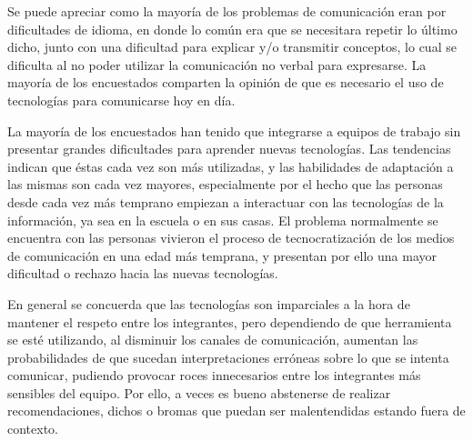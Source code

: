 Se puede apreciar como la mayoría de los problemas de comunicación eran por
dificultades de idioma, en donde lo común era que se necesitara repetir lo
último dicho, junto con una dificultad para explicar y/o transmitir conceptos,
lo cual se dificulta al no poder utilizar la comunicación no verbal para
expresarse. La mayoría de los encuestados comparten la opinión de que es
necesario el uso de tecnologías para comunicarse hoy en día. 

La mayoría de los encuestados han tenido que integrarse a equipos de trabajo
sin presentar grandes dificultades para aprender nuevas tecnologías. Las
tendencias indican que éstas cada vez son más utilizadas, y las habilidades de
adaptación a las mismas son cada vez mayores, especialmente por el hecho que
las personas desde cada vez más temprano empiezan a interactuar con las
tecnologías de la información, ya sea en la escuela o en sus casas. El
problema normalmente se encuentra con las personas vivieron el proceso de
tecnocratización de los medios de comunicación en una edad más temprana, y
presentan por ello una mayor dificultad o rechazo hacia las nuevas
tecnologías.

En general se concuerda que las tecnologías son imparciales a la hora de
mantener el respeto entre los integrantes, pero dependiendo de que herramienta
se esté utilizando, al disminuir los canales de comunicación, aumentan las
probabilidades de que sucedan interpretaciones erróneas sobre lo que se
intenta comunicar, pudiendo provocar roces innecesarios entre los integrantes
más sensibles del equipo. Por ello, a veces es bueno abstenerse de realizar
recomendaciones, dichos o bromas que puedan ser malentendidas estando fuera de
contexto.
